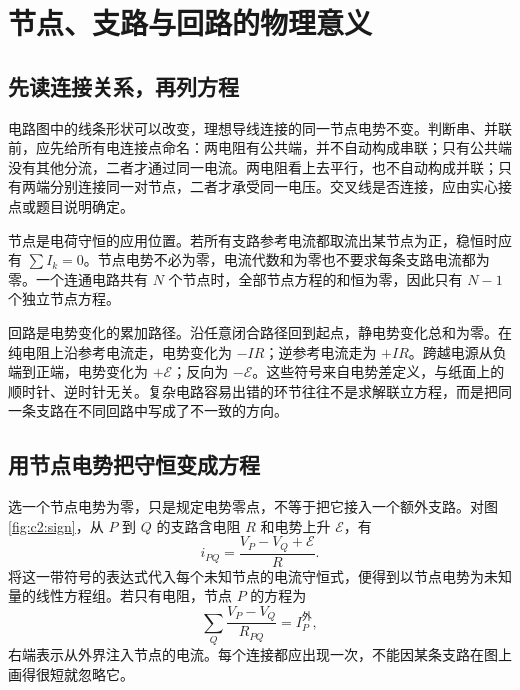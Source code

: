 \section{节点、支路与回路的物理意义}
\subsection{先读连接关系，再列方程}

电路图中的线条形状可以改变，理想导线连接的同一节点电势不变。判断串、并联前，应先给所有电连接点命名：两电阻有公共端，并不自动构成串联；只有公共端没有其他分流，二者才通过同一电流。两电阻看上去平行，也不自动构成并联；只有两端分别连接同一对节点，二者才承受同一电压。交叉线是否连接，应由实心接点或题目说明确定。

节点是电荷守恒的应用位置。若所有支路参考电流都取流出某节点为正，稳恒时应有 $\sum I_k=0$。节点电势不必为零，电流代数和为零也不要求每条支路电流都为零。一个连通电路共有 $N$ 个节点时，全部节点方程的和恒为零，因此只有 $N-1$ 个独立节点方程。

回路是电势变化的累加路径。沿任意闭合路径回到起点，静电势变化总和为零。在纯电阻上沿参考电流走，电势变化为 $-IR$；逆参考电流走为 $+IR$。跨越电源从负端到正端，电势变化为 $+\mathcal E$；反向为 $-\mathcal E$。这些符号来自电势差定义，与纸面上的顺时针、逆时针无关。复杂电路容易出错的环节往往不是求解联立方程，而是把同一条支路在不同回路中写成了不一致的方向。

\subsection{用节点电势把守恒变成方程}

选一个节点电势为零，只是规定电势零点，不等于把它接入一个额外支路。对图\ref{fig:c2:sign}，从 $P$ 到 $Q$ 的支路含电阻 $R$ 和电势上升 $\mathcal E$，有
\[
 i_{PQ}=\frac{V_P-V_Q+\mathcal E}{R}.
\]
将这一带符号的表达式代入每个未知节点的电流守恒式，便得到以节点电势为未知量的线性方程组。若只有电阻，节点 $P$ 的方程为
\[
 \sum_Q\frac{V_P-V_Q}{R_{PQ}}=I_P^{\text{外}},
\]
右端表示从外界注入节点的电流。每个连接都应出现一次，不能因某条支路在图上画得很短就忽略它。


